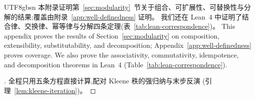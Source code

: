 \begin{CJK*}{UTF8}{gbsn}
\ifPaperChinese
本附录证明第~\ref{sec:modularity}~节关于组合、可扩展性、可替换性与分解的结果;覆盖由附录~\ref{app:well-definedness} 证明。
我们还在 Lean~4 中证明了结合律、交换律、幂等律与分解四条定理(表~\ref{tab:lean-correspondence})。
\else
This appendix proves the results of Section~\ref{sec:modularity} on composition, extensibility,
substitutability, and decomposition; Appendix~\ref{app:well-definedness} proves coverage.
We also prove the associativity, commutativity, idempotence, and decomposition theorems in Lean~4
(Table~\ref{tab:lean-correspondence}).
\fi



\begin{proof}[]
\ifPaperChinese
  全程只用五条方程直接计算,配对 Kleene 秩的强归纳与末步反演
  (引理~\ref{lem:kleene-iteration})。


\end{proof}
\end{CJK*}

